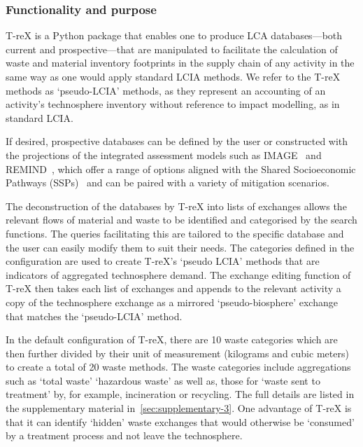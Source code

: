 \documentclass[a4paper,fleqn]{cas-dc}
\begin{document}
	\subsubsection{Functionality and purpose}
	
	T-reX is a Python package that enables one to produce LCA databases---both
	current and prospective---that are manipulated to facilitate the calculation of
	waste and material inventory footprints in the supply chain of any activity in
	the same way as one would apply standard LCIA methods. We refer to the T-reX
	methods as `pseudo-LCIA' methods, as they represent an accounting of an
	activity's technosphere inventory without reference to impact modelling, as in
	standard LCIA.
	
	If desired, prospective databases can be defined by the user or constructed
	with the projections of the integrated assessment models such as
	IMAGE~\citep{stehfest2014image} and REMIND~\citep{remind2020model}, which offer
	a range of options aligned with the Shared Socioeconomic Pathways
	(SSPs)~\citep{ssp2020ghg} and can be paired with a variety of mitigation
	scenarios.
	
	The deconstruction of the databases by T-reX into lists of exchanges allows the
	relevant flows of material and waste to be identified and categorised by the
	search functions. The queries facilitating this are tailored to the specific
	database and the user can easily modify them to suit their needs. The
	categories defined in the configuration are used to create T-reX's `pseudo
	LCIA' methods that are indicators of aggregated technosphere demand. The
	exchange editing function of T-reX then takes each list of exchanges and
	appends to the relevant activity a copy of the technosphere exchange as a
	mirrored `pseudo-biosphere' exchange that matches the `pseudo-LCIA' method.
	
	In the default configuration of T-reX, there are 10 waste categories which are
	then further divided by their unit of measurement (kilograms and cubic meters)
	to create a total of 20 waste methods. The waste categories include
	aggregations such as `total waste' `hazardous waste' as well as, those for
	`waste sent to treatment' by, for example, incineration or recycling. The full
	details are listed in the supplementary material in~\autoref{sec:supplementary-3}. One advantage of T-reX is that it can identify `hidden' waste
	exchanges that would otherwise be `consumed' by a treatment process and not
	leave the technosphere.
	
\end{document}
